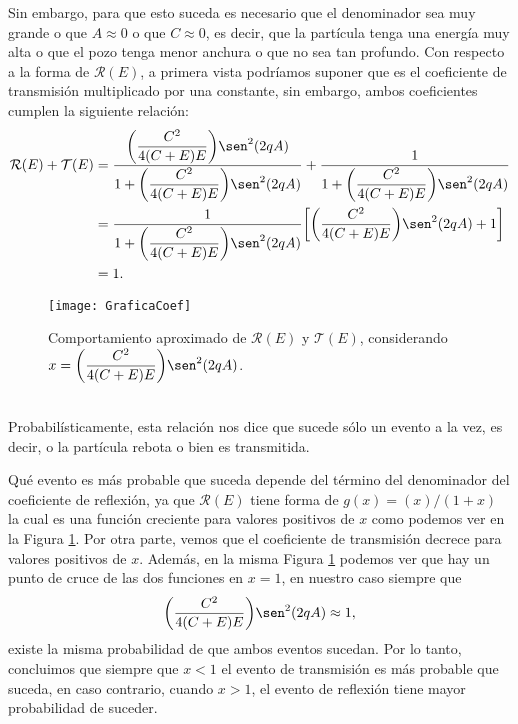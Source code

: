 \documentclass[12pt]{article}
\theoremstyle{definition}
\begin{document}
Sin embargo, para que esto suceda es necesario que el denominador sea muy grande o que $A\approx 0$ o que $C\approx 0$, es decir, que la partícula tenga una energía muy alta o que el pozo tenga menor anchura o que no sea tan profundo. Con respecto a la forma de $\mathcal{R}(E)$, a primera vista podríamos suponer que es el coeficiente de transmisión multiplicado por una constante, sin embargo, ambos coeficientes cumplen la siguiente relación:
\begin{align*}
    \mathcal{R}(E) + \mathcal{T}(E) & = \frac{\bigg(\dfrac{C^2}{4(C+E)E}\bigg)\sen^2(2qA)}{1+\bigg(\dfrac{C^2}{4(C+E)E}\bigg)\sen^2(2qA)} + \frac{1}{1+\bigg(\dfrac{C^2}{4(C+E)E}\bigg)\sen^2(2qA)}
    \\
    &
    =
    \frac{1}{1+\bigg(\dfrac{C^2}{4(C+E)E}\bigg)\sen^2(2qA)}\bigg[
    \bigg(\dfrac{C^2}{4(C+E)E}\bigg)\sen^2(2qA) +1
    \bigg]
    \\
    &
    =
    1.
\end{align*}
\begin{figure}[h]
    \centering
    \texttt{[image: GraficaCoef]}
    \caption{Comportamiento aproximado de $\mathcal{R}(E)$ y $\mathcal{T}(E)$, considerando $x = \bigg(\dfrac{C^2}{4(C+E)E}\bigg)\sen^2(2qA)$.}
    \label{fig:Aproximacion}
\end{figure}
\\


Probabilísticamente, esta relación nos dice que sucede sólo un evento a la vez, es decir, o la partícula  rebota o bien es transmitida.

Qué evento es más probable que suceda depende del término del denominador del coeficiente de reflexión, ya que $\mathcal{R}(E)$ tiene forma de $g(x) = (x)/(1+x)$ la cual es una función creciente para valores positivos de $x$ como podemos ver en la Figura \ref{fig:Aproximacion}. Por otra parte, vemos que el coeficiente de transmisión decrece para valores positivos de $x$. Además, en la misma Figura \ref{fig:Aproximacion} podemos ver que hay un punto de cruce de las dos funciones en $x = 1$, en nuestro caso siempre que
\begin{align*}
    \bigg(\frac{C^2}{4(C+E)E}\bigg)\sen^2(2qA) \approx 1,
\end{align*}
existe la misma probabilidad de que ambos eventos sucedan. Por lo tanto, concluimos que siempre que $x < 1$ el evento de transmisión es más probable que suceda, en caso contrario, cuando $ x > 1$, el evento de reflexión tiene mayor probabilidad de suceder.
\end{document}
